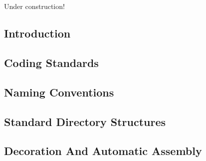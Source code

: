 \chapter{\cmpdzerolongtitle{}}

\label{cmpd0}

                     {Under construction!}


\section{Introduction}


\section{Coding Standards}


\section{Naming Conventions}


\section{Standard Directory Structures}


\section{Decoration And Automatic Assembly}






